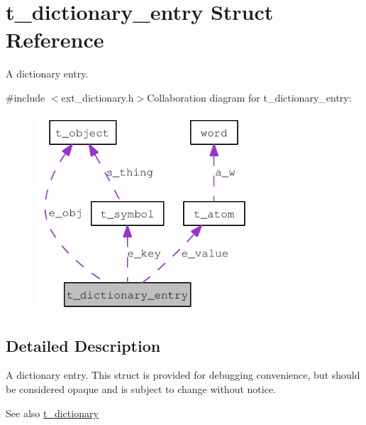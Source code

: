 \hypertarget{structt__dictionary__entry}{
\section{t\_\-dictionary\_\-entry Struct Reference}
\label{structt__dictionary__entry}
}


A dictionary entry.  


{\ttfamily \#include $<$ext\_\-dictionary.h$>$}Collaboration diagram for t\_\-dictionary\_\-entry:\nopagebreak
\begin{figure}[H]
\begin{center}
\leavevmode
\includegraphics[width=227pt]{structt__dictionary__entry__coll__graph}
\end{center}
\end{figure}


\subsection{Detailed Description}
A dictionary entry. This struct is provided for debugging convenience, but should be considered opaque and is subject to change without notice.

\begin{DoxySeeAlso}{See also}
\hyperlink{structt__dictionary}{t\_\-dictionary} 
\end{DoxySeeAlso}
